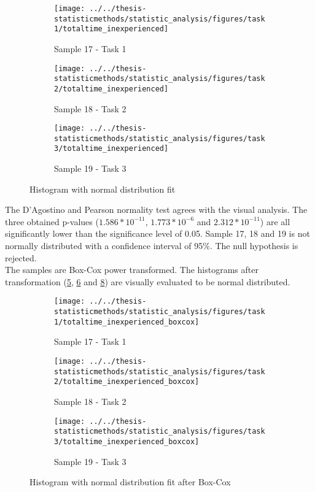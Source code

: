 \begin{figure}[H]
	\centering
	\begin{subfigure}[b]{0.32\textwidth}
		\centering
		\texttt{[image: ../../thesis-statisticmethods/statistic\_analysis/figures/task1/totaltime\_inexperienced]}
		\caption{Sample 17 - Task 1}
		\label{fig:totaltimeinexperienced_task1}
	\end{subfigure}
	\begin{subfigure}[b]{0.32\textwidth}
		\centering
		\texttt{[image: ../../thesis-statisticmethods/statistic\_analysis/figures/task2/totaltime\_inexperienced]}
		\caption{Sample 18 - Task 2}
		\label{fig:totaltimeinexperienced_task2}
	\end{subfigure}
	\begin{subfigure}[b]{0.32\textwidth}
		\centering
		\texttt{[image: ../../thesis-statisticmethods/statistic\_analysis/figures/task3/totaltime\_inexperienced]}
		\caption{Sample 19 - Task 3}
		\label{fig:totaltimeinexperienced_task3}
	\end{subfigure}
	\caption{Histogram with normal distribution fit}
\end{figure}

The D'Agostino and Pearson normality test agrees with the visual analysis. The three obtained p-values ($1.586 * 10^{-11}$, $1.773 * 10^{-6}$ and $2.312 * 10 ^{-11}$) are all significantly lower than the significance level of 0.05. Sample 17, 18 and 19 is not normally distributed with a confidence interval of 95\%. The null hypothesis is rejected. \\[0.2cm]

The samples are Box-Cox power transformed. The histograms after transformation (\ref{fig:totaltimeinexperiencedboxcox_task1}, \ref{fig:totaltimeinexperiencedboxcox_task2} and \ref{fig:totaltimeinexperiencedboxcox_task3}) are visually evaluated to be normal distributed. 

\begin{figure}[H]
	\centering
	\begin{subfigure}[b]{0.32\textwidth}
		\centering
		\texttt{[image: ../../thesis-statisticmethods/statistic\_analysis/figures/task1/totaltime\_inexperienced\_boxcox]}
		\caption{Sample 17 - Task 1}
		\label{fig:totaltimeinexperiencedboxcox_task1}
	\end{subfigure}
	\begin{subfigure}[b]{0.32\textwidth}
		\centering
		\texttt{[image: ../../thesis-statisticmethods/statistic\_analysis/figures/task2/totaltime\_inexperienced\_boxcox]}
		\caption{Sample 18 - Task 2}
		\label{fig:totaltimeinexperiencedboxcox_task2}
	\end{subfigure}
	\begin{subfigure}[b]{0.32\textwidth}
		\centering
		\texttt{[image: ../../thesis-statisticmethods/statistic\_analysis/figures/task3/totaltime\_inexperienced\_boxcox]}
		\caption{Sample 19 - Task 3}
		\label{fig:totaltimeinexperiencedboxcox_task3}
	\end{subfigure}
	\caption{Histogram with normal distribution fit after Box-Cox}
\end{figure}

